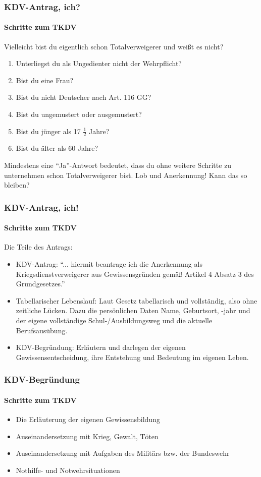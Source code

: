 \documentclass{beamer}
\begin{document}
	\begin{frame}
		\frametitle{KDV-Antrag, ich?}
		\framesubtitle{Schritte zum TKDV}
		Vielleicht bist du eigentlich schon Totalverweigerer und weißt es nicht? 
		\begin{enumerate}
			\item Unterliegst du als Ungedienter nicht der Wehrpflicht?
			\item Bist du eine Frau? 
			\item Bist du nicht Deutscher nach Art. 116 GG?
			\item Bist du ungemustert oder ausgemustert?
			\item Bist du jünger als 17 $ \frac{1}{2} $ Jahre?
			\item Bist du älter als 60 Jahre?
		\end{enumerate}
		Mindestens eine \enquote{Ja}-Antwort bedeutet, dass du ohne weitere Schritte zu unternehmen schon Totalverweigerer bist. Lob und Anerkennung! Kann das so bleiben? %
	\end{frame}
	
	\begin{frame}
		\frametitle{KDV-Antrag, ich!}
		\framesubtitle{Schritte zum TKDV}
		Die Teile des Antrags:
		\begin{itemize}
			\item KDV-Antrag: \enquote{... hiermit beantrage ich die Anerkennung als Kriegsdienstverweigerer aus Gewissensgründen gemäß Artikel 4 Absatz 3 des Grundgesetzes.}
			\item Tabellarischer Lebenslauf: Laut Gesetz tabellarisch und vollständig, also ohne zeitliche Lücken. Dazu die persönlichen Daten Name, Geburtsort, -jahr und der eigene vollständige Schul-/Ausbildungsweg und die aktuelle Berufsausübung.
			\item KDV-Begründung: Erläutern und darlegen der eigenen Gewissensentscheidung, ihre Entstehung und Bedeutung im eigenen Leben.
		\end{itemize}			
	\end{frame}
	
	\begin{frame}
		\frametitle{KDV-Begründung}
		\framesubtitle{Schritte zum TKDV}
		\begin{itemize}
			\item Die Erläuterung der eigenen Gewissensbildung
			\item Auseinandersetzung mit Krieg, Gewalt, Töten
			\item Auseinandersetzung mit Aufgaben des Militärs bzw. der Bundeswehr
			\item Nothilfe- und Notwehrsituationen
		\end{itemize}
	\end{frame}
	
\end{document}
